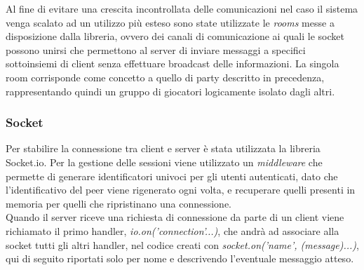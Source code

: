 Al fine di evitare una crescita incontrollata delle comunicazioni nel caso il sistema venga scalato ad un utilizzo più esteso sono state utilizzate le \emph{rooms} \cite{socketIORooms} messe a disposizione dalla libreria, ovvero dei canali di comunicazione ai quali le socket possono unirsi che permettono al server di inviare messaggi a specifici sottoinsiemi di client senza effettuare broadcast delle informazioni. La singola room corrisponde come concetto a quello di party descritto in precedenza, rappresentando quindi un gruppo di giocatori logicamente isolato dagli altri.

\subsubsection*{Socket}
Per stabilire la connessione tra client e server è stata utilizzata la libreria Socket.io. Per la gestione delle sessioni viene utilizzato un \emph{middleware} \cite{socketIOMiddlewares} che permette di generare identificatori univoci per gli utenti autenticati, dato che l'identificativo del peer viene rigenerato ogni volta, e recuperare quelli presenti in memoria per quelli che ripristinano una connessione.\\
Quando il server riceve una richiesta di connessione da parte di un client viene richiamato il primo handler, \textit{io.on('connection'...)}, che andrà ad associare alla socket tutti gli altri handler, nel codice creati con \textit{socket.on('name', (message)...)}, qui di seguito riportati solo per nome e descrivendo l'eventuale messaggio atteso.

